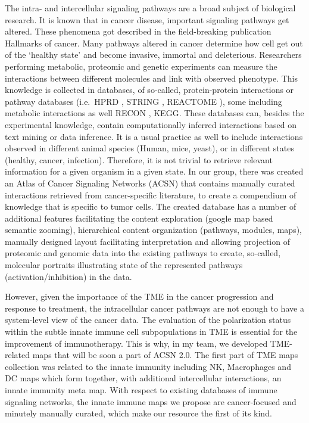 \documentclass[12pt,]{book}
\theoremstyle{definition}
\theoremstyle{definition}
\theoremstyle{definition}
\theoremstyle{remark}
\begin{document}
The intra- and intercellular signaling pathways are a broad subject of
biological research. It is known that in cancer disease, important
signaling pathways get altered. These phenomena got described in the
field-breaking \citep{Hanahan2000} publication Hallmarks of cancer. Many
pathways altered in cancer determine how cell get out of the `healthy
state' and become invasive, immortal and deleterious. Researchers
performing metabolic, proteomic and genetic experiments can measure the
interactions between different molecules and link with observed
phenotype. This knowledge is collected in databases, of so-called,
protein-protein interactions or pathway databases (i.e.~HPRD
\citep{KeshavaPrasad2009}, STRING \citep{Szklarczyk2017}, REACTOME
\citep{JoshiTope2004}), some including metabolic interactions as well
RECON \citep{Brunk2018}, KEGG\citep{Kanehisa2000}. These databases can,
besides the experimental knowledge, contain computationally inferred
interactions based on text mining or data inference. It is a usual
practice as well to include interactions observed in different animal
species (Human, mice, yeast), or in different states (healthy, cancer,
infection). Therefore, it is not trivial to retrieve relevant
information for a given organism in a given state. In our group, there
was created an Atlas of Cancer Signaling Networks (ACSN) that contains
manually curated interactions retrieved from cancer-specific literature,
to create a compendium of knowledge that is specific to tumor cells. The
created database has a number of additional features facilitating the
content exploration (google map based semantic zooming), hierarchical
content organization (pathways, modules, maps), manually designed layout
facilitating interpretation and allowing projection of proteomic and
genomic data into the existing pathways to create, so-called, molecular
portraits illustrating state of the represented pathways
(activation/inhibition) in the data.

However, given the importance of the TME in the cancer progression and
response to treatment, the intracellular cancer pathways are not enough
to have a system-level view of the cancer data. The evaluation of the
polarization status within the subtle innate immune cell subpopulations
in TME is essential for the improvement of immunotherapy. This is why,
in my team, we developed TME-related maps that will be soon a part of
ACSN 2.0. The first part of TME maps collection was related to the
innate immunity including NK, Macrophages and DC maps which form
together, with additional intercellular interactions, an innate immunity
meta map. With respect to existing databases of immune signaling
networks, the innate immune maps we propose are cancer-focused and
minutely manually curated, which make our resource the first of its
kind.
\end{document}
